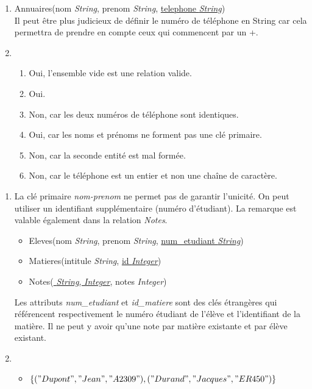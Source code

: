 \documentclass[a4paper,11pt]{article}
\begin{document}
\begin{Form}
\begin{exo}
\begin{enumerate}
\item Annuaires(nom \emph{String}, prenom \emph{String}, \underline{telephone \emph{String}})\\
Il peut être plus judicieux de définir le numéro de téléphone en String car cela permettra de prendre en compte ceux qui commencent par un +.
\item
\begin{enumerate}
\item Oui, l'ensemble vide est une relation valide.
\item Oui.
\item Non, car les deux numéros de téléphone sont identiques.
\item Oui, car les noms et prénoms ne forment pas une clé primaire.
\item Non, car la seconde entité est mal formée.
\item Non, car le téléphone est un entier et non une chaîne de caractère.
\end{enumerate}
\end{enumerate}
\end{exo}
\begin{exo}
\begin{enumerate}
\item La clé primaire \emph{nom-prenom} ne permet pas de garantir l'unicité. On peut utiliser un identifiant supplémentaire (numéro d'étudiant). La remarque est valable également dans la relation \emph{Notes}. 
\begin{itemize}
\item Eleves(nom \emph{String}, prenom \emph{String}, \underline{num\_etudiant \emph{String}})
\item Matieres(intitule \emph{String}, \underline{id \emph{Integer}})
\item Notes(\underline{ \emph{String},  \emph{Integer}}, notes \emph{Integer})
\end{itemize}
Les attributs \emph{num\_etudiant} et \emph{id\_matiere} sont des clés étrangères qui référencent respectivement le numéro étudiant de l'élève et l'identifiant de la matière. Il ne peut y avoir qu'une note par matière existante et par élève existant.
\item 
\begin{itemize}
\item $\{("Dupont", "Jean", "A2309"), ("Durand", "Jacques", "ER450")\}$

\end{itemize}
\end{enumerate}
\end{exo}
\end{Form}
\end{document}
